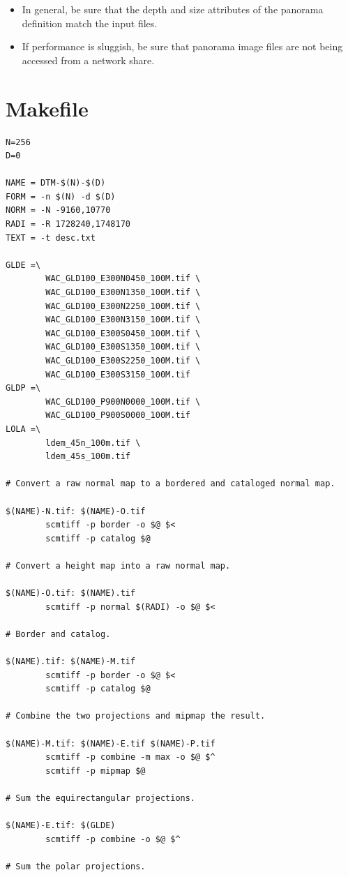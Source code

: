 \documentclass[oneside,10pt]{memoir}
\begin{document}
\begin{Spacing}{1.1}
\begin{itemize}
\item In general, be sure that the depth and size attributes of the panorama definition match the input files.

\item If performance is sluggish, be sure that panorama image files are not being accessed from a network share.
\end{itemize}

\appendix
\chapter{Makefile}
\label{cha:makefile}

\begin{Verbatim}
N=256
D=0

NAME = DTM-$(N)-$(D)
FORM = -n $(N) -d $(D)
NORM = -N -9160,10770
RADI = -R 1728240,1748170
TEXT = -t desc.txt

GLDE =\
        WAC_GLD100_E300N0450_100M.tif \
        WAC_GLD100_E300N1350_100M.tif \
        WAC_GLD100_E300N2250_100M.tif \
        WAC_GLD100_E300N3150_100M.tif \
        WAC_GLD100_E300S0450_100M.tif \
        WAC_GLD100_E300S1350_100M.tif \
        WAC_GLD100_E300S2250_100M.tif \
        WAC_GLD100_E300S3150_100M.tif
GLDP =\
        WAC_GLD100_P900N0000_100M.tif \
        WAC_GLD100_P900S0000_100M.tif
LOLA =\
        ldem_45n_100m.tif \
        ldem_45s_100m.tif

# Convert a raw normal map to a bordered and cataloged normal map.

$(NAME)-N.tif: $(NAME)-O.tif
        scmtiff -p border -o $@ $<
        scmtiff -p catalog $@

# Convert a height map into a raw normal map.

$(NAME)-O.tif: $(NAME).tif
        scmtiff -p normal $(RADI) -o $@ $<

# Border and catalog.

$(NAME).tif: $(NAME)-M.tif
        scmtiff -p border -o $@ $<
        scmtiff -p catalog $@

# Combine the two projections and mipmap the result.

$(NAME)-M.tif: $(NAME)-E.tif $(NAME)-P.tif
        scmtiff -p combine -m max -o $@ $^
        scmtiff -p mipmap $@

# Sum the equirectangular projections.

$(NAME)-E.tif: $(GLDE)
        scmtiff -p combine -o $@ $^

# Sum the polar projections.


\end{Verbatim}
\end{Spacing}
\end{document}
